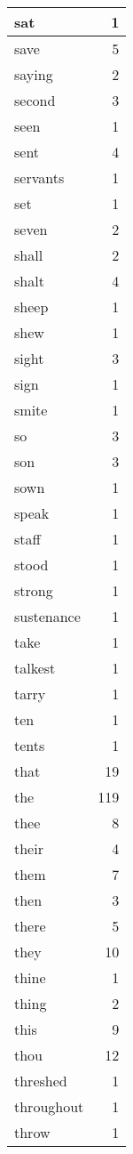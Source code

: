 \begin{center}
\begin{longtable}{l|r}
sat & 1\\ \hline 
save & 5\\ \hline 
saying & 2\\ \hline 
second & 3\\ \hline 
seen & 1\\ \hline 
sent & 4\\ \hline 
servants & 1\\ \hline 
set & 1\\ \hline 
seven & 2\\ \hline 
shall & 2\\ \hline 
shalt & 4\\ \hline 
sheep & 1\\ \hline 
shew & 1\\ \hline 
sight & 3\\ \hline 
sign & 1\\ \hline 
smite & 1\\ \hline 
so & 3\\ \hline 
son & 3\\ \hline 
sown & 1\\ \hline 
speak & 1\\ \hline 
staff & 1\\ \hline 
stood & 1\\ \hline 
strong & 1\\ \hline 
sustenance & 1\\ \hline 
take & 1\\ \hline 
talkest & 1\\ \hline 
tarry & 1\\ \hline 
ten & 1\\ \hline 
tents & 1\\ \hline 
that & 19\\ \hline 
the & 119\\ \hline 
thee & 8\\ \hline 
their & 4\\ \hline 
them & 7\\ \hline 
then & 3\\ \hline 
there & 5\\ \hline 
they & 10\\ \hline 
thine & 1\\ \hline 
thing & 2\\ \hline 
this & 9\\ \hline 
thou & 12\\ \hline 
threshed & 1\\ \hline 
throughout & 1\\ \hline 
throw & 1\\ \hline 

\end{longtable}
\end{center}
